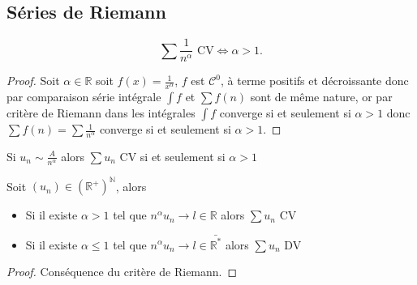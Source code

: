\documentclass[11pt,colorlinks]{book}
\theoremstyle{mytheoremstyle}
\theoremstyle{mytheoremstyle}
\theoremstyle{mytheoremstyle}
\theoremstyle{mytheoremstyle}
\theoremstyle{mytheoremstyle}
\theoremstyle{mytheoremstyle}
\theoremstyle{mytheoremstyle}
\theoremstyle{mytheoremstyle}
\theoremstyle{myproblemstyle}
\def\mbb#1{\mathbb{#1}}
\def\bN{\mbb{N}}
\def\bR{\mbb{R}}
\def\mC{\mathcal{C}}
\def\rNp{\left(\bR^{+}\right)^{\bN}}
\renewcommand{\equiv}{\sim}
\begin{document}
\subsection{Séries de Riemann}
\begin{theorem}
  \begin{equation*}
    \sum \frac{1}{n^{\alpha}} \text{ CV} \Leftrightarrow \alpha > 1 \text{.}
  \end{equation*}
  \begin{proof}
    Soit $\alpha \in \bR$ soit $f(x) = \frac{1}{x^{\alpha}}$, $f$ est $\mC^0$, à terme positifs et décroissante 
    donc par comparaison série intégrale $\int f$ et $\sum f(n)$ sont de même nature, or par critère de Riemann dans les 
    intégrales $\int f$ converge si et seulement si $\alpha > 1$ donc $\sum f(n) = \sum \frac{1}{n^{\alpha}}$ converge si et 
    seulement si $\alpha > 1$.
  \end{proof}
\end{theorem}
\begin{rmq}
  Si $u_n \equiv \frac{A}{n^{\alpha}}$ alors $\sum u_n$ CV si et seulement si $\alpha > 1$ 
\end{rmq}
\begin{prop}
  Soit $(u_n) \in \rNp$, alors 
  \begin{itemize}
    \item Si il existe $\alpha > 1$ tel que $n^{\alpha}u_n \to l \in \bR$ alors $\sum u_n$ CV
    \item Si il existe $\alpha \leq 1$ tel que $n^{\alpha}u_n \to l \in \bar{\bR^{*}}$ alors $\sum u_n$ DV
  \end{itemize}
  \begin{proof}
    Conséquence du critère de Riemann.
  \end{proof}
\end{prop}
\end{document}
